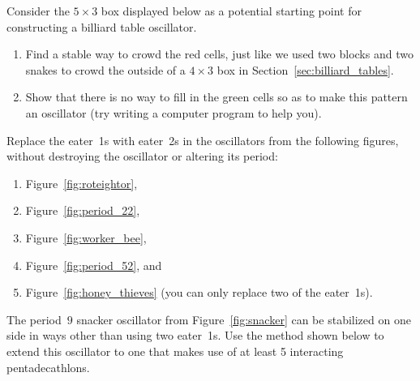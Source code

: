 \begin{multicols}{2}
	
	\begin{problem}\label{exer:billiard_table_5x3} 
		Consider the $5 \times 3$ box displayed below as a potential starting point for constructing a billiard table oscillator.
		
		\begin{center}
		\end{center}
		
		\begin{enumerate}[label=\bf\color{ocre}(\alph*)]
			\item Find a stable way to crowd the red cells, just like we used two blocks and two snakes to crowd the outside of a $4 \times 3$ box in Section~\ref{sec:billiard_tables}.
			
			\item Show that there is no way to fill in the green cells so as to make this pattern an oscillator (try writing a computer program to help you).
		\end{enumerate}
	\end{problem}
	
	
	\mfilbreak
	
	
	\begin{problem}\label{exer:eater_1_replace_eater_2_osc} 
		Replace the eater~1s with eater~2s in the oscillators from the following figures, without destroying the oscillator or altering its period:\smallskip
		
		\begin{enumerate}[label=\bf\color{ocre}(\alph*)]
			\item Figure~\ref{fig:roteightor},
			
			\item Figure~\ref{fig:period_22},
			
			\item Figure~\ref{fig:worker_bee},
			
			\item Figure~\ref{fig:period_52}, and
			
			\item Figure~\ref{fig:honey_thieves} (you can only replace two of the eater~1s). 
		\end{enumerate}
	\end{problem}
	
	
	\mfilbreak
	
	
	\begin{problem}\label{exer:extend_snacker} 
		The period~$9$ snacker oscillator from Figure~\ref{fig:snacker} can be stabilized on one side in ways other than using two eater~1s. Use the method shown below to extend this oscillator to one that makes use of at least 5 interacting pentadecathlons.
		

\end{problem}
\end{multicols}
